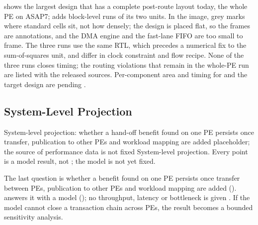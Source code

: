 %
 shows the largest design that has a complete post-route layout today, the whole PE on ASAP7;  adds block-level runs of its two units.
In the image, grey marks where standard cells sit, not how densely; the design is placed flat, so the frames are annotations, and the DMA engine and the fast-lane FIFO are too small to frame.
The three runs use the same RTL, which precedes a numerical fix to the sum-of-squares unit, and differ in clock constraint and flow recipe.
None of the three runs closes timing; the routing violations that remain in the whole-PE run are listed with the released sources.
Per-component area and timing for \cfgCorrected and the target design are pending .

\subsection{System-Level Projection}\label{sec:res-system}

%
  {System-level projection: whether a hand-off benefit found on one PE persists once transfer, publication to other PEs and workload mapping are added}%
  {placeholder; the source of performance data is not fixed}%
  {System-level projection. Every point is a model result, not \evRTL; the model is not yet fixed.}

%
The last question is whether a benefit found on one PE persists once transfer between PEs, publication to other PEs and workload mapping are added ().
\cfgProjected answers it with a model (); no throughput, latency or bottleneck is given  .
If the model cannot close a transaction chain across PEs, the result becomes a bounded sensitivity analysis.

